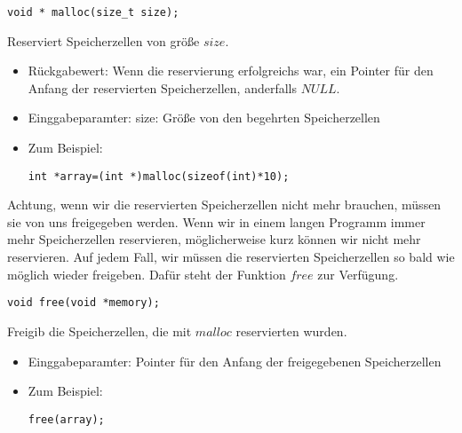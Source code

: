 \documentclass{article}[12pt]
\newenvironment{myexampleblock}[1]{%
    \tcolorbox[beamer,%
    noparskip,breakable,
    colback=White,colframe=ForestGreen,%
    colbacklower=LimeGreen!75!White,%
    title=#1]}%
    {\endtcolorbox}
\begin{document}
\begin{myexampleblock}{Funktion definition \texttt{malloc}}
\begin{lstlisting}
void * malloc(size_t size);
\end{lstlisting}
\vspace{-0.7cm}
Reserviert Speicherzellen von größe $size$.
\begin{itemize}
\itemsep0.2pt
\item Rückgabewert: Wenn die reservierung erfolgreichs war, ein Pointer für den Anfang der 
reservierten Speicherzellen, anderfalls $NULL$.
\item Einggabeparamter: size: Größe von den begehrten Speicherzellen
\item Zum Beispiel:
\begin{lstlisting}
int *array=(int *)malloc(sizeof(int)*10);
\end{lstlisting}
\end{itemize}
\vspace{-0.7cm}
Achtung, wenn wir die reservierten Speicherzellen nicht mehr brauchen, müssen sie 
von uns freigegeben werden.
\end{myexampleblock}
Wenn wir in einem langen Programm immer mehr Speicherzellen reservieren, 
möglicherweise kurz können wir nicht mehr reservieren. Auf jedem Fall, wir müssen
die reservierten Speicherzellen so bald wie möglich wieder freigeben. Dafür steht
der Funktion $free$ zur Verfügung.
\begin{myexampleblock}{Funktion definition \texttt{free}}
\begin{lstlisting}
void free(void *memory);
\end{lstlisting}
\vspace{-0.7cm}
Freigib die Speicherzellen, die mit $malloc$ reservierten wurden.
\begin{itemize}
\item Einggabeparamter: Pointer für den Anfang der freigegebenen Speicherzellen
\item Zum Beispiel:
\begin{lstlisting}
free(array);
\end{lstlisting}
\end{itemize}
\vspace{-0.7cm}
\end{myexampleblock}
\end{document}
